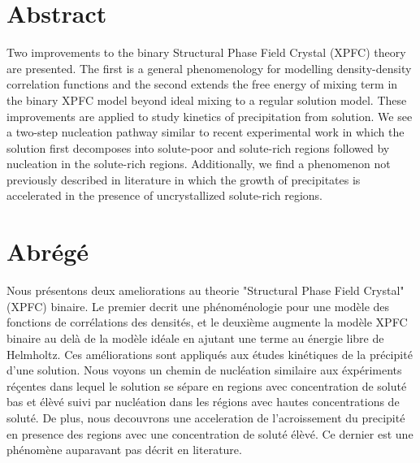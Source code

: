 \section*{Abstract}
\label{sec:abstract}

Two improvements to the binary Structural Phase Field Crystal (XPFC) theory are
presented. The first is a general phenomenology for modelling density-density
correlation functions and the second extends the free energy of mixing term in
the binary XPFC model beyond ideal mixing to a regular solution model. These
improvements are applied to study kinetics of precipitation from solution. We
see a two-step nucleation pathway similar to recent experimental work
\cite{LOH17, WALLACE13} in which the solution first decomposes into solute-poor
and solute-rich regions followed by nucleation in the solute-rich regions.
Additionally, we find a phenomenon not previously described in literature in
which the growth of precipitates is accelerated in the presence of
uncrystallized solute-rich regions.

\clearpage

\section*{Abrégé}
\label{sec:abrege}

Nous présentons deux ameliorations au theorie "Structural Phase Field Crystal"
(XPFC) binaire. Le premier decrit une phénoménologie pour une modèle des
fonctions de corrélations des densités, et le deuxième augmente la modèle XPFC
binaire au delà de la modèle idéale en ajutant une terme au énergie libre de
Helmholtz. Ces améliorations sont appliqués aux études kinétiques de la
précipité d'une solution. Nous voyons un chemin de nucléation similaire aux
éxpériments réçentes \cite{LOH17, WALLACE13} dans lequel le solution se sépare
en regions avec concentration de soluté bas et élèvé suivi par nucléation dans
les régions avec hautes concentrations de soluté. De plus, nous decouvrons une
acceleration de l'acroissement du precipité en presence des regions avec une
concentration de soluté élèvé. Ce dernier est une phénomène auparavant pas
décrit en literature. 
